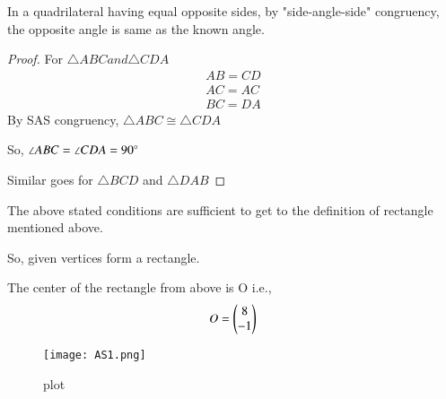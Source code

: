 \documentclass[journal,12pt,twocolumn]{IEEEtran}
\begin{document}
\begin{lemma}
In a quadrilateral having equal opposite sides, by "side-angle-side" congruency, the opposite angle is same as the known angle.
\end{lemma} 
\begin{proof}
For $\triangle ABC and \triangle CDA$
\begin{align}
    AB = CD\\
    AC = AC\\
    BC = DA
\end{align}
By SAS congruency, $\triangle ABC \cong \triangle CDA$

So, $\angle ABC = \angle CDA = 90\degree$

Similar goes for $\triangle BCD$ and $\triangle DAB$
\end{proof}
The above stated conditions are sufficient to get to the definition of rectangle mentioned above.

So, given vertices form a rectangle.

The center of the rectangle from above is O i.e.,
\begin{align}
    O = \begin{pmatrix}8\\ -1\end{pmatrix}
\end{align}

\begin{figure}[htp]
    \centering
    \texttt{[image: AS1.png]}
    \caption{plot}
    \label{fig:my_label}
\end{figure}
\end{document}
